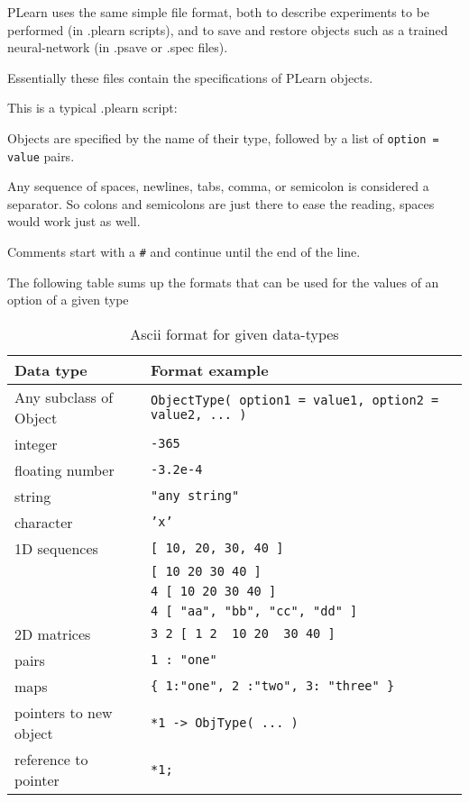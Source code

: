 \documentclass[11pt]{book}
\begin{document}
PLearn uses the same simple file format, both to describe experiments to be
performed (in .plearn scripts), and to save and restore objects
such as a trained neural-network (in .psave or .spec files).

Essentially these files contain the specifications of PLearn objects.

This is a typical .plearn script:



Objects are specified by the name of their type, followed by a list of
\verb!option = value! pairs. 

Any sequence of spaces, newlines, tabs, comma, or semicolon is considered a
separator. So colons and semicolons are just there to ease the reading,
spaces would work just as well.

Comments start with a \verb!#! and continue until the end of the line.

The following table sums up the formats that can be used for the values of
an option of a given type

\begin{table}[h]
\caption{ Ascii format for given data-types }
\label{tab:ascii-format-ex}
\begin{tabular}{|l|l|} \hline 
{\bf Data type}         & {\bf Format example} \\ \hline
Any subclass of Object & {\tt ObjectType( option1 = value1, option2 = value2, ... )} \\ \hline
integer                 & {\tt -365} \\ \hline
floating number         & {\tt -3.2e-4} \\ \hline
string                  & {\tt "any string"} \\ \hline
character               & {\tt 'x'} \\ \hline
1D sequences            & {\tt [ 10, 20, 30, 40 ] } \\ 
                        & {\tt [ 10 20 30 40 ] } \\
                        & {\tt 4 [ 10 20 30 40 ] } \\ 
                        & {\tt 4 [ "aa", "bb", "cc", "dd" ] } \\ \hline
2D matrices             & \verb!3 2 [ 1 2  10 20  30 40 ]!    \\ \hline
pairs                   & {\tt 1 : "one" }  \\ \hline
maps                    & \verb!{ 1:"one", 2 :"two", 3: "three" }! \\ \hline
pointers to new object  & \verb!*1 -> ObjType( ... )! \\ \hline
reference to pointer    & \verb!*1;! \\ \hline
\end{tabular}
\begin{center}
\end{center}
\end{table}
\end{document}
